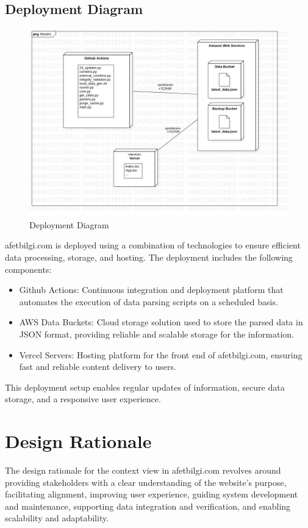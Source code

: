 \documentclass[12pt]{report}
\begin{document}
\subsection{Deployment Diagram}
\begin{figure}[H]
    \includegraphics[scale=0.5]{deploy1}
    \centering
    \caption{Deployment Diagram}
\end{figure}

afetbilgi.com is deployed using a combination of technologies to ensure efficient data processing, storage, and hosting. The deployment includes the following components:
\begin{itemize}
    \item Github Actions: Continuous integration and deployment platform that automates the execution of data parsing scripts on a scheduled basis.

    \item AWS Data Buckets: Cloud storage solution used to store the parsed data in JSON format, providing reliable and scalable storage for the information.

    \item Vercel Servers: Hosting platform for the front end of afetbilgi.com, ensuring fast and reliable content delivery to users.
\end{itemize}
    

This deployment setup enables regular updates of information, secure data storage, and a responsive user experience.

\section{Design Rationale}
The design rationale for the context view in afetbilgi.com revolves around providing stakeholders with a clear understanding of the website's purpose, facilitating alignment, improving user experience, guiding system development and maintenance, supporting data integration and verification, and enabling scalability and adaptability.
\newline
\end{document}
